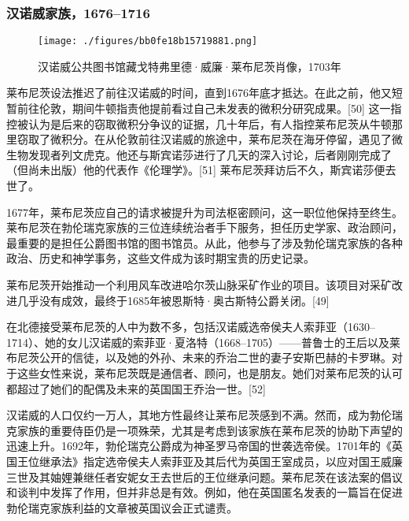 \subsubsection{汉诺威家族，1676–1716}
\begin{figure}[ht]
\centering
\texttt{[image: ./figures/bb0fe18b15719881.png]}
\caption{汉诺威公共图书馆藏戈特弗里德·威廉·莱布尼茨肖像，1703年} \label{fig_LBNC_3}
\end{figure}
莱布尼茨设法推迟了前往汉诺威的时间，直到1676年底才抵达。在此之前，他又短暂前往伦敦，期间牛顿指责他提前看过自己未发表的微积分研究成果。[50] 这一指控被认为是后来的窃取微积分争议的证据，几十年后，有人指控莱布尼茨从牛顿那里窃取了微积分。在从伦敦前往汉诺威的旅途中，莱布尼茨在海牙停留，遇见了微生物发现者列文虎克。他还与斯宾诺莎进行了几天的深入讨论，后者刚刚完成了（但尚未出版）他的代表作《伦理学》。[51] 莱布尼茨拜访后不久，斯宾诺莎便去世了。

1677年，莱布尼茨应自己的请求被提升为司法枢密顾问，这一职位他保持至终生。莱布尼茨在勃伦瑞克家族的三位连续统治者手下服务，担任历史学家、政治顾问，最重要的是担任公爵图书馆的图书馆员。从此，他参与了涉及勃伦瑞克家族的各种政治、历史和神学事务，这些文件成为该时期宝贵的历史记录。

莱布尼茨开始推动一个利用风车改进哈尔茨山脉采矿作业的项目。该项目对采矿改进几乎没有成效，最终于1685年被恩斯特·奥古斯特公爵关闭。[49]

在北德接受莱布尼茨的人中为数不多，包括汉诺威选帝侯夫人索菲亚（1630–1714）、她的女儿汉诺威的索菲亚·夏洛特（1668–1705）——普鲁士的王后以及莱布尼茨公开的信徒，以及她的外孙、未来的乔治二世的妻子安斯巴赫的卡罗琳。对于这些女性来说，莱布尼茨既是通信者、顾问，也是朋友。她们对莱布尼茨的认可都超过了她们的配偶及未来的英国国王乔治一世。[52]

汉诺威的人口仅约一万人，其地方性最终让莱布尼茨感到不满。然而，成为勃伦瑞克家族的重要侍臣仍是一项殊荣，尤其是考虑到该家族在莱布尼茨的协助下声望的迅速上升。1692年，勃伦瑞克公爵成为神圣罗马帝国的世袭选帝侯。1701年的《英国王位继承法》指定选帝侯夫人索菲亚及其后代为英国王室成员，以应对国王威廉三世及其妯娌兼继任者安妮女王去世后的王位继承问题。莱布尼茨在该法案的倡议和谈判中发挥了作用，但并非总是有效。例如，他在英国匿名发表的一篇旨在促进勃伦瑞克家族利益的文章被英国议会正式谴责。

